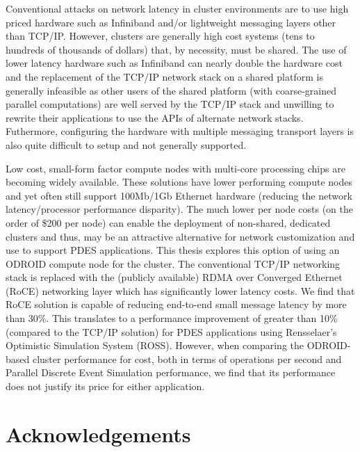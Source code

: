 \documentclass[11pt]{book}
\begin{document}
Conventional attacks on network latency in cluster environments are to use high priced
hardware such as Infiniband and/or lightweight messaging layers other than TCP/IP.
However, clusters are generally high cost systems (tens to hundreds of thousands of dollars)
that, by necessity, must be shared.  The use of lower latency hardware such as Infiniband
can nearly double the hardware cost and the replacement of the TCP/IP network stack on a
shared platform is generally infeasible as other users of the shared platform (with
coarse-grained parallel computations) are well served by the TCP/IP stack and unwilling to
rewrite their applications to use the APIs of alternate network stacks.  Futhermore,
configuring the hardware with multiple messaging transport layers is also quite difficult
to setup and not generally supported.

Low cost, small-form factor compute nodes with multi-core processing chips are becoming
widely available.  These solutions have lower performing compute nodes and yet often still
support 100Mb/1Gb Ethernet hardware (reducing the network latency/processor performance
disparity).  The much lower per node costs (on the order of \$200 per node) can enable the
deployment of non-shared, dedicated clusters and thus, may be an attractive alternative
for network customization and use to support PDES applications.  This thesis explores this
option of using an ODROID compute node for the cluster.  The conventional TCP/IP
networking stack is replaced with the (publicly available) RDMA over Converged Ethernet
(RoCE) networking layer which has significantly lower latency costs.  We find that RoCE
solution is capable of reducing end-to-end small message latency by more than 30\%.  This
translates to a performance improvement of greater than 10\% (compared to the TCP/IP
solution) for PDES applications using Rensselaer's Optimistic Simulation System (ROSS).
However, when comparing the ODROID-based cluster performance for cost, both in terms of
operations per second and Parallel Discrete Event Simulation performance, we find that its
performance does not justify its price for either application.

\chapter*{Acknowledgements}


\tableofcontents \markright{ }
\listoffigures \markright{ }
\listoftables \markright{ }
\end{document}
